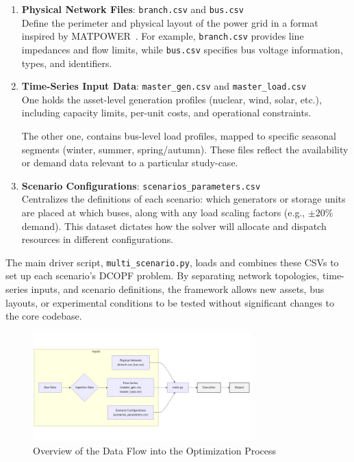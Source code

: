 \begin{enumerate}
  \item \textbf{Physical Network Files}: \texttt{branch.csv} and \texttt{bus.csv} \\
  Define the perimeter and physical layout of the power grid in a format inspired by MATPOWER~\cite{matpower2024}. 
  For example, \texttt{branch.csv} provides line impedances and flow limits, while \texttt{bus.csv} specifies bus 
  voltage information, types, and identifiers.
  
  \item \textbf{Time-Series Input Data}: \texttt{master\_gen.csv} and \texttt{master\_load.csv} \\
  One holds the asset-level generation profiles (nuclear, wind, solar, etc.), including capacity 
  limits, per-unit costs, and operational constraints. 
  
  The other one, contains bus-level load profiles, mapped to specific seasonal segments (winter, summer, 
  spring/autumn). These files reflect the availability or demand data relevant to a particular study-case.
  
  \item \textbf{Scenario Configurations}: \texttt{scenarios\_parameters.csv} \\
  Centralizes the definitions of each scenario: which generators or storage units are placed at which buses, along 
  with any load scaling factors (e.g., $\pm20\%$ demand). This dataset dictates how the solver will allocate and 
  dispatch resources in different configurations.
\end{enumerate}

The main driver script, \texttt{multi\_scenario.py}, loads and combines these CSVs to set up each scenario’s 
DCOPF problem. By separating network topologies, time-series inputs, and scenario definitions, the framework 
allows new assets, bus layouts, or experimental conditions to be tested without significant changes to the 
core codebase.

\begin{figure}[H]
    \centering
    \includegraphics[width=0.75\textwidth]{images/input-flow.jpeg}
    \caption{Overview of the Data Flow into the Optimization Process} \label{fig:input-flow}
\end{figure}

